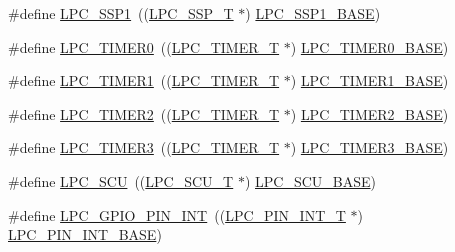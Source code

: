 \begin{DoxyCompactItemize}
\item 
\#define \hyperlink{group___p_e_r_i_p_h__18_x_x___b_a_s_e_ga09c4610ada1d9aa18913963cbd1a6e52}{L\+P\+C\+\_\+\+S\+S\+P1}~((\hyperlink{struct_l_p_c___s_s_p___t}{L\+P\+C\+\_\+\+S\+S\+P\+\_\+T}              $\ast$) \hyperlink{group___p_e_r_i_p_h__43_x_x___b_a_s_e_ga05d118997f53f596d3a087f8b91a1969}{L\+P\+C\+\_\+\+S\+S\+P1\+\_\+\+B\+A\+SE})
\item 
\#define \hyperlink{group___p_e_r_i_p_h__18_x_x___b_a_s_e_ga800f32a8a38d9e9c8f3b6ab161f6f2d2}{L\+P\+C\+\_\+\+T\+I\+M\+E\+R0}~((\hyperlink{struct_l_p_c___t_i_m_e_r___t}{L\+P\+C\+\_\+\+T\+I\+M\+E\+R\+\_\+T}            $\ast$) \hyperlink{group___p_e_r_i_p_h__43_x_x___b_a_s_e_ga58d2cc2a6a4bd9319853ad5b62a20d43}{L\+P\+C\+\_\+\+T\+I\+M\+E\+R0\+\_\+\+B\+A\+SE})
\item 
\#define \hyperlink{group___p_e_r_i_p_h__18_x_x___b_a_s_e_ga0d28200f11e877cece24025ebe7fe72a}{L\+P\+C\+\_\+\+T\+I\+M\+E\+R1}~((\hyperlink{struct_l_p_c___t_i_m_e_r___t}{L\+P\+C\+\_\+\+T\+I\+M\+E\+R\+\_\+T}            $\ast$) \hyperlink{group___p_e_r_i_p_h__43_x_x___b_a_s_e_ga077e94a95d95d79f6aeb0ea962377c46}{L\+P\+C\+\_\+\+T\+I\+M\+E\+R1\+\_\+\+B\+A\+SE})
\item 
\#define \hyperlink{group___p_e_r_i_p_h__18_x_x___b_a_s_e_gae0a3c421e7e1ac3ffd7e740e33387dc5}{L\+P\+C\+\_\+\+T\+I\+M\+E\+R2}~((\hyperlink{struct_l_p_c___t_i_m_e_r___t}{L\+P\+C\+\_\+\+T\+I\+M\+E\+R\+\_\+T}            $\ast$) \hyperlink{group___p_e_r_i_p_h__43_x_x___b_a_s_e_gab46122134a159b494e060ae3a7be0967}{L\+P\+C\+\_\+\+T\+I\+M\+E\+R2\+\_\+\+B\+A\+SE})
\item 
\#define \hyperlink{group___p_e_r_i_p_h__18_x_x___b_a_s_e_gab34ae64ea250497b5148b7ffb61d04f5}{L\+P\+C\+\_\+\+T\+I\+M\+E\+R3}~((\hyperlink{struct_l_p_c___t_i_m_e_r___t}{L\+P\+C\+\_\+\+T\+I\+M\+E\+R\+\_\+T}            $\ast$) \hyperlink{group___p_e_r_i_p_h__43_x_x___b_a_s_e_ga002e95d51eef32473052ea2575440eac}{L\+P\+C\+\_\+\+T\+I\+M\+E\+R3\+\_\+\+B\+A\+SE})
\item 
\#define \hyperlink{group___p_e_r_i_p_h__18_x_x___b_a_s_e_ga95e2a586609fde90e5ff88298208f269}{L\+P\+C\+\_\+\+S\+CU}~((\hyperlink{struct_l_p_c___s_c_u___t}{L\+P\+C\+\_\+\+S\+C\+U\+\_\+T}              $\ast$) \hyperlink{group___p_e_r_i_p_h__43_x_x___b_a_s_e_gacd777eafbfcbc5701c9728c9261b1bd1}{L\+P\+C\+\_\+\+S\+C\+U\+\_\+\+B\+A\+SE})
\item 
\#define \hyperlink{group___p_e_r_i_p_h__18_x_x___b_a_s_e_gaa58960983d95c688cd33ff8ca91f99f3}{L\+P\+C\+\_\+\+G\+P\+I\+O\+\_\+\+P\+I\+N\+\_\+\+I\+NT}~((\hyperlink{struct_l_p_c___p_i_n___i_n_t___t}{L\+P\+C\+\_\+\+P\+I\+N\+\_\+\+I\+N\+T\+\_\+T}          $\ast$) \hyperlink{group___p_e_r_i_p_h__43_x_x___b_a_s_e_ga4941871b3be823925361fe29e1d7721f}{L\+P\+C\+\_\+\+P\+I\+N\+\_\+\+I\+N\+T\+\_\+\+B\+A\+SE})

\end{DoxyCompactItemize}
